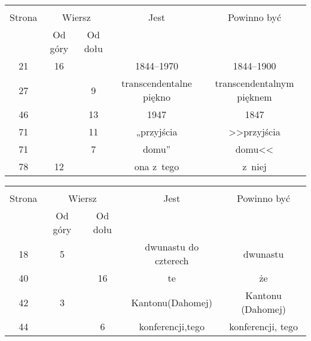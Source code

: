 \documentclass[a4paper,11pt]{article}
\begin{document}
\begin{center}

  \begin{tabular}{|c|c|c|c|c|}
    \hline
    & \multicolumn{2}{c|}{} & & \\
    Strona & \multicolumn{2}{c|}{Wiersz} & Jest
                              & Powinno być \\ \cline{2-3}
    & Od góry & Od dołu & & \\
    \hline
    21  & 16 & & 1844--1970 & 1844--1900 \\
    27  & &  9 & transcendentalne piękno & transcendentalnym pięknem \\
    46  & & 13 & 1947 & 1847 \\
    71  & & 11 & „przyjścia & >>przyjścia \\
    71  & &  7 & domu” & domu<< \\
    78  & 12 & & ona z~tego & z~niej \\
    \hline
  \end{tabular}

\end{center}

\vspace{\spaceTwo}













\begin{center}

  \begin{tabular}{|c|c|c|c|c|}
    \hline
    & \multicolumn{2}{c|}{} & & \\
    Strona & \multicolumn{2}{c|}{Wiersz} & Jest
                              & Powinno być \\ \cline{2-3}
    & Od góry & Od dołu & & \\
    \hline
    18  &  5 & & dwunastu do czterech & dwunastu \\
    40  & & 16 & te & że \\
    42  &  3 & & Kantonu(Dahomej) & Kantonu (Dahomej) \\
    44  & &  6 & konferencji,tego & konferencji, tego \\
    \hline
  \end{tabular}

\end{center}
\end{document}
